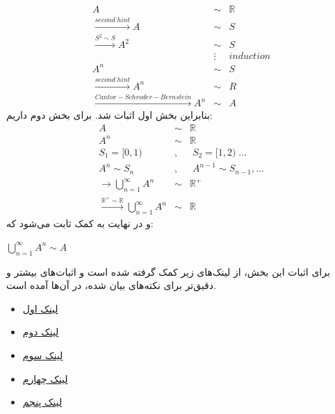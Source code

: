 \begin{enumerate}
\begin{eqnarray*}
            A &\sim& \mathbb{R}\\
            \xrightarrow{second\; hint} 
            A &\sim& S\\
            \xrightarrow{S^2\sim S} A^2 &\sim& S\\
            &\vdots& induction\\
            A^n &\sim& S\\
            \xrightarrow{second\; hint} A^n &\sim& R\\
            \xrightarrow{Cantor-Schroder-Bernstein} A^n &\sim&
            A
        \end{eqnarray*}
        بنابراین بخش اول اثبات شد. برای بخش دوم داریم:\\[0.1in]
        \begin{eqnarray*}
            A &\sim& \mathbb{R}\\
            A^n &\sim& \mathbb{R}\\
            S_1=[0,1)&,&\;S_2=[1,2)\;\ldots\\
            A^n \sim S_n&,&\; A^{n-1} \sim S_{n-1}, \ldots\\
            \xrightarrow{} \bigcup_{n=1}^\infty A^n &\sim&
            \mathbb{R}^+\\
            \xrightarrow{\mathbb{R}^+ \sim \mathbb{R}}
            \bigcup_{n=1}^\infty A^n &\sim&
            \mathbb{R}
        \end{eqnarray*}
        و در نهایت به کمک
         ثابت می‌شود که:\\[0.1in]
        \begin{center}
            $\bigcup_{n=1}^\infty A^n \sim
            A$\\[0.2in]
        \end{center}
        برای اثبات این بخش، از لینک‌های زیر کمک گرفته شده است و اثبات‌های بیشتر و دقیق‌تر برای نکته‌های بیان شده، در آ‌ن‌ها آمده است.
        \begin{itemize}
            \item 
                \href{https://math.stackexchange.com/questions/1071261/how-the-cardinality-of-mathbbr-and-mathbbr-same#:~:text=Logarithmic%20map%20is%20from%20R,R%2B%20and%20R%20is%20same.}{لینک اول}
            \item 
                \href{https://math.stackexchange.com/questions/183361/examples-of-bijective-map-from-mathbbr3-rightarrow-mathbbr/183383#183383}{لینک دوم}
            \item 
                \href{https://math.stackexchange.com/questions/290019/cardinality-of-mathbbr-and-mathbbr2}{لینک سوم}
            \item 
                \href{https://web.williams.edu/Mathematics/lg5/CanBer.pdf}{لینک چهارم}
            \item 
                \href{https://web.uvic.ca/~gmacgill/LFNotes/Cardinality.pdf}{لینک پنجم}
        \end{itemize}
\end{enumerate}